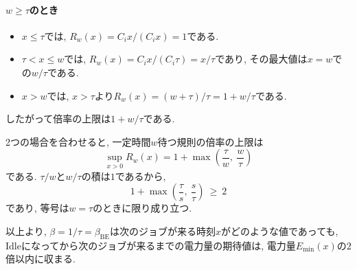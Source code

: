 \paragraph{$w \ge \tau$のとき}
\begin{itemize}
    \item $x \le \tau$では, $R_w(x) = C_i x/(C_i x) = 1$である.
    \item $\tau < x \le w$では, $R_w(x) = C_i x/(C_i\tau) = x/\tau$であり, その最大値は$x = w$での$w/\tau$である.
    \item $x > w$では, $x > \tau$より$R_w(x) = (w+\tau)/\tau = 1 + w/\tau$である.
\end{itemize}
したがって倍率の上限は$1 + w/\tau$である.

2つの場合を合わせると, 一定時間$w$待つ規則の倍率の上限は
\begin{equation}
    \sup_{x > 0} R_w(x) = 1 + \max\!\left(\frac{\tau}{w},\ \frac{w}{\tau}\right)
    \label{eq:app-sup-deterministic}
\end{equation}
である.
$\tau/w$と$w/\tau$の積は$1$であるから,
\begin{equation*}
    1 + \max\!\left(\frac{\tau}{s},\ \frac{s}{\tau}\right) \ \ge\ 2
\end{equation*}
であり, 等号は$w = \tau$のときに限り成り立つ.

以上より, $\beta = 1/\tau = \beta_{\mathrm{BE}}$は次のジョブが来る時刻$x$がどのような値であっても, Idleになってから次のジョブが来るまでの電力量の期待値は, 電力量$E_{\min}(x)$の$2$倍以内に収まる.
